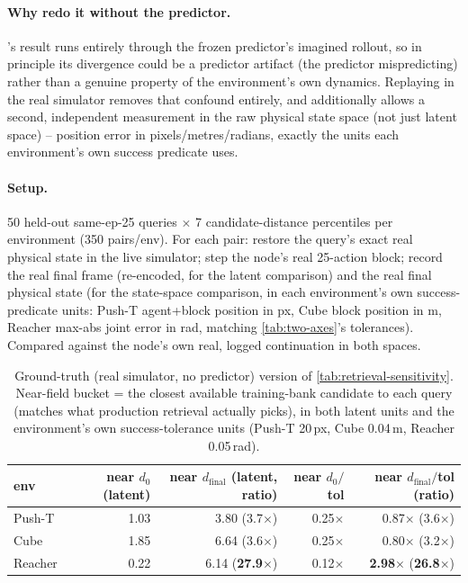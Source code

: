 \documentclass[11pt]{article}
\begin{document}
\paragraph{Why redo it without the predictor.} 's
result runs entirely through the frozen predictor's imagined rollout, so in principle its
divergence could be a predictor artifact (the predictor mispredicting) rather than a genuine
property of the environment's own dynamics. Replaying in the real simulator removes that
confound entirely, and additionally allows a second, independent measurement in the raw
physical state space (not just latent space) -- position error in pixels/metres/radians,
exactly the units each environment's own success predicate uses.

\paragraph{Setup.} 50 held-out same-ep-25 queries $\times$ 7 candidate-distance percentiles
per environment (350 pairs/env). For each pair: restore the query's exact real physical state
in the live simulator; step the node's real 25-action block; record the real final frame
(re-encoded, for the latent comparison) and the real final physical state (for the state-space
comparison, in each environment's own success-predicate units: Push-T agent+block position in
px, Cube block position in m, Reacher max-abs joint error in rad, matching
\cref{tab:two-axes}'s tolerances). Compared against the node's own real, logged continuation
in both spaces.

\begin{table}[H]
\centering\small
\caption{Ground-truth (real simulator, no predictor) version of \cref{tab:retrieval-sensitivity}.
Near-field bucket = the closest available training-bank candidate to each query (matches what
production retrieval actually picks), in both latent units and the environment's own
success-tolerance units (Push-T 20\,px, Cube 0.04\,m, Reacher 0.05\,rad).}
\label{tab:retrieval-sensitivity-real}
\begin{tabular}{lrrrr}
\toprule
env & near $d_0$ (latent) & near $d_{\text{final}}$ (latent, ratio) & near $d_0/$tol & near $d_{\text{final}}/$tol (ratio) \\
\midrule
Push-T   & 1.03 & 3.80 (3.7$\times$)   & 0.25$\times$ & 0.87$\times$ (3.6$\times$) \\
Cube     & 1.85 & 6.64 (3.6$\times$)   & 0.25$\times$ & 0.80$\times$ (3.2$\times$) \\
Reacher  & 0.22 & 6.14 (\textbf{27.9$\times$}) & 0.12$\times$ & \textbf{2.98$\times$} (\textbf{26.8$\times$}) \\
\bottomrule
\end{tabular}
\end{table}
\end{document}
